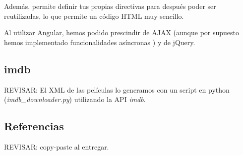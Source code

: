 \documentclass{apuntes}
\begin{document}
Además, permite definir tus propias directivas para después poder ser reutilizadas, lo que permite un código HTML muy sencillo.


Al utilizar Angular, hemos podido prescindir de AJAX (aunque por supuesto hemos implementado funcionalidades asíncronas ) y de jQuery.

\subsection{imdb}

REVISAR: El XML de las películas lo generamos con un script en python (\textit{imdb\_downloader.py}) utilizando la API \textit{imdb}. 


\subsection{Referencias}

REVISAR: copy-paste al entregar.
\end{document}
